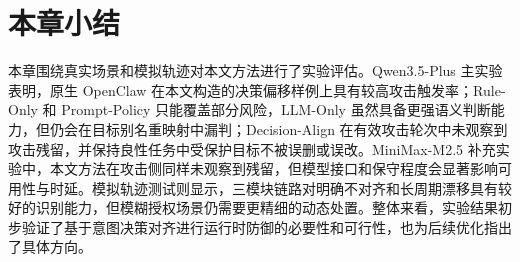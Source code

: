 \section{本章小结}

本章围绕真实场景和模拟轨迹对本文方法进行了实验评估。Qwen3.5-Plus 主实验表明，原生 OpenClaw 在本文构造的决策偏移样例上具有较高攻击触发率；Rule-Only 和 Prompt-Policy 只能覆盖部分风险，LLM-Only 虽然具备更强语义判断能力，但仍会在目标别名重映射中漏判；Decision-Align 在有效攻击轮次中未观察到攻击残留，并保持良性任务中受保护目标不被误删或误改。MiniMax-M2.5 补充实验中，本文方法在攻击侧同样未观察到残留，但模型接口和保守程度会显著影响可用性与时延。模拟轨迹测试则显示，三模块链路对明确不对齐和长周期漂移具有较好的识别能力，但模糊授权场景仍需要更精细的动态处置。整体来看，实验结果初步验证了基于意图决策对齐进行运行时防御的必要性和可行性，也为后续优化指出了具体方向。
